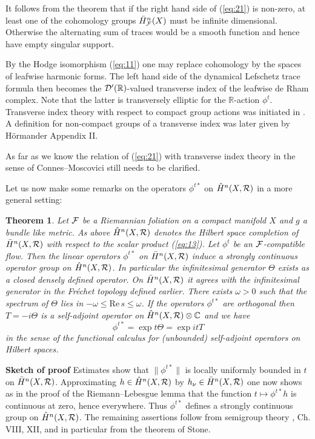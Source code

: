 \documentclass[11pt,leqno]{article}
\newcommand{\C}{{\mathbb{C}}}
\newcommand{\R}{{\mathbb{R}}}
\newcommand{\RRe}{\mathrm{Re}\,}
\newcommand{\Dh}{{\cal D}}
\newcommand{\Fh}{{\cal F}}
\newcommand{\Rh}{{\cal R}}
\newcommand{\oH}{\bar{H}}
\newtheorem{theorem}{Theorem}[section]
\begin{document}
It follows from the theorem that if the right hand side of (\ref{eq:21}) is non-zero, at least one of the cohomology groups $\oH^n_{\Fh} (X)$ must be infinite dimensional. Otherwise the alternating sum of traces would be a smooth function and hence have empty singular support.

By the Hodge isomorphism (\ref{eq:11}) one may replace cohomology by the spaces of leafwise harmonic forms. The left hand side of the dynamical Lefschetz trace formula then becomes the $\Dh' (\R)$-valued transverse index of the leafwise de Rham complex. Note that the latter is transversely elliptic for the $\R$-action $\phi^t$. Transverse index theory with respect to compact group actions was initiated in \cite{A}. A definition for non-compact groups of a transverse index was later given by H\"ormander \cite{Si} Appendix II. 

As far as we know the relation of (\ref{eq:21}) with transverse index theory in the sense of Connes--Moscovici still needs to be clarified.

Let us now make some remarks on the operators $\phi^{t*}$ on $\hat{H}^n (X,\Rh)$ in a more general setting:

\begin{theorem}
  \label{t8}
Let $\Fh$ be a Riemannian foliation on a compact manifold $X$ and $g$ a bundle like metric. As above $\hat{H}^n (X,\Rh)$ denotes the Hilbert space completion of $\oH^n (X,\Rh)$ with respect to the scalar product (\ref{eq:13}). Let $\phi^t$ be an $\Fh$-compatible flow. Then the linear operators $\phi^{t*}$ on $\oH^n (X,\Rh)$ induce a strongly continuous operator group on $\hat{H}^n (X,\Rh)$. In particular the infinitesimal generator $\Theta$ exists as a closed densely defined operator. On $\oH^n (X,\Rh)$ it agrees with the infinitesimal generator in the Fr\'echet topology defined earlier. There exists $\omega > 0$ such that the spectrum of $\Theta$ lies in $- \omega \le \RRe s \le \omega$. If the operators $\phi^{t*}$ are orthogonal then $T = - i \Theta$ is a self-adjoint operator on $\hat{H}^n (X,\Rh) \otimes \C$ and we have
\[
\phi^{t*} = \exp t \Theta = \exp it T
\]
in the sense of the functional calculus for (unbounded) self-adjoint operators on Hilbert spaces. 
\end{theorem}

{\bf Sketch of proof} Estimates show that $\| \phi^{t*} \|$ is locally uniformly bounded in $t$ on $\oH^n (X,\Rh)$. Approximating $h \in \hat{H}^n (X,\Rh)$ by $h_{\nu} \in \oH^n (X,\Rh)$ one now shows as in the proof of the Riemann--Lebesgue lemma that the function $t \mapsto \phi^{t*} h$ is continuous at zero, hence everywhere. Thus $\phi^{t*}$ defines a strongly continuous group on $\hat{H}^n (X,\Rh)$. The remaining assertions follow from semigroup theory \cite{DSch}, Ch. VIII, XII, and in particular from the theorem of Stone.
\end{document}
